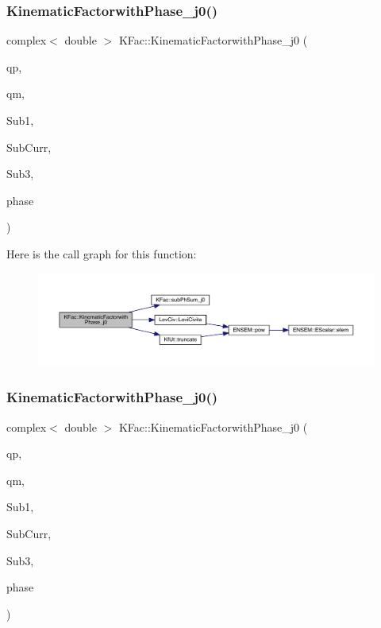 \subsubsection{\texorpdfstring{KinematicFactorwithPhase\_j0()}{KinematicFactorwithPhase\_j0()}\hspace{0.1cm}{\footnotesize\ttfamily [1/2]}}
{\footnotesize\ttfamily complex$<$ double $>$ K\+Fac\+::\+Kinematic\+Factorwith\+Phase\+\_\+j0 (\begin{DoxyParamCaption}\item[{Eigen\+::\+Vector\+Xd \&}]{qp,  }\item[{Eigen\+::\+Vector\+Xd \&}]{qm,  }\item[{map$<$ int, Eigen\+::\+Matrix\+Xcd $>$ \&}]{Sub1,  }\item[{Eigen\+::\+Matrix\+Xcd \&}]{Sub\+Curr,  }\item[{map$<$ int, Eigen\+::\+Matrix\+Xcd $>$ \&}]{Sub3,  }\item[{\mbox{\hyperlink{structPh_1_1phChars}{Ph\+::ph\+Chars}} \&}]{phase }\end{DoxyParamCaption})}

Here is the call graph for this function\+:\nopagebreak
\begin{figure}[H]
\begin{center}
\leavevmode
\includegraphics[width=350pt]{d2/d89/namespaceKFac_a8a20f176fbf91758f8699734b8df3f04_cgraph}
\end{center}
\end{figure}
\mbox{\label{namespaceKFac_a87a5304db9d4c659637da23e363cf4a4}} 
\subsubsection{\texorpdfstring{KinematicFactorwithPhase\_j0()}{KinematicFactorwithPhase\_j0()}\hspace{0.1cm}{\footnotesize\ttfamily [2/2]}}
{\footnotesize\ttfamily complex$<$ double $>$ K\+Fac\+::\+Kinematic\+Factorwith\+Phase\+\_\+j0 (\begin{DoxyParamCaption}\item[{Eigen\+::\+Vector\+Xd \&}]{qp,  }\item[{Eigen\+::\+Vector\+Xd \&}]{qm,  }\item[{map$<$ int, Eigen\+::\+Matrix\+Xcd $>$ \&}]{Sub1,  }\item[{map$<$ int, Eigen\+::\+Matrix\+Xcd $>$ \&}]{Sub\+Curr,  }\item[{map$<$ int, Eigen\+::\+Matrix\+Xcd $>$ \&}]{Sub3,  }\item[{\mbox{\hyperlink{structPh_1_1phChars}{Ph\+::ph\+Chars}} \&}]{phase }\end{DoxyParamCaption})}

